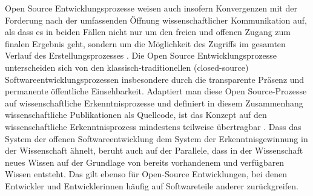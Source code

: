 Open Source Entwicklungsprozesse weisen auch insofern Konvergenzen mit der Forderung nach der umfassenden Öffnung wissenschaftlicher Kommunikation auf, als dass es in beiden Fällen nicht nur um den freien und offenen Zugang zum finalen Ergebnis geht, sondern um die Möglichkeit des Zugriffs im gesamten Verlauf des Erstellungsprozesses \cite{kelty_2004}. Die Open Source Entwicklungsprozesse unterscheiden sich von den klassisch-traditionellen (closed-source) Softwareentwicklungsprozessen insbesondere durch die transparente Präsenz und permanente öffentliche Einsehbarkeit. Adaptiert man diese Open Source-Prozesse auf wissenschaftliche Erkenntnisprozesse und definiert in diesem Zusammenhang wissenschaftliche Publikationen als Quellcode, ist das Konzept auf den wissenschaftliche Erkenntnisprozess mindestens teilweise übertragbar \cite{garcia_2010_open} \cite{Singh_2008} \cite{Bradley_2008} \cite{mantz_2007_open} \cite{dorschel_2006_open} \cite{Bradley_2007} \cite{Willinsky_2005}. Dass das System der offenen Softwareentwicklung dem System der Erkenntnisgewinnung in der Wissenschaft ähnelt, beruht auch auf der Parallele, dass in der Wissenschaft neues Wissen auf der Grundlage von bereits vorhandenem und verfügbaren Wissen entsteht. Das gilt ebenso für Open-Source Entwicklungen, bei denen Entwickler und Entwicklerinnen häufig auf Softwareteile anderer zurückgreifen.

